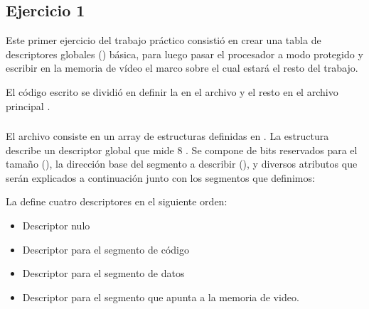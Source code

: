 \subsection{Ejercicio 1}
	Este primer ejercicio del trabajo práctico consistió en crear una tabla de descriptores globales () básica, para luego pasar el 
procesador a modo protegido y escribir en la memoria de vídeo el marco sobre el cual estará el resto del trabajo.

 	El código escrito se dividió en definir la  en el archivo  y el resto en el archivo principal .

\subsubsection{}
	El archivo consiste en un array de estructuras  definidas en . La estructura describe un descriptor global 
que mide 8 .
	Se compone de bits reservados para el tamaño (), la dirección base del segmento a describir (), y diversos atributos 
que serán explicados a continuación junto con los segmentos que definimos:

\noindent La  define cuatro descriptores en el siguiente orden:
\begin{itemize}
	\item Descriptor nulo
	\item Descriptor para el segmento de código
	\item Descriptor para el segmento de datos
	\item Descriptor para el segmento que apunta a la memoria de video.
\end{itemize}

